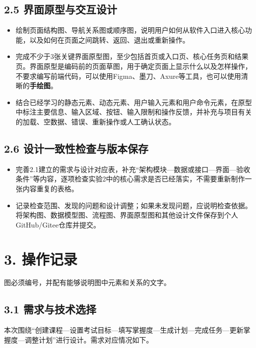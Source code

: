 \documentclass[UTF8,12pt,a4paper]{ctexart}
\begin{document}
\subsection*{2.5 界面原型与交互设计}

\begin{itemize}
  \item 绘制页面结构图、导航关系图或顺序图，说明用户如何从软件入口进入核心功能，以及如何在页面之间跳转、返回、退出或重新操作。
  \item 完成不少于3张关键界面原型图，至少包括首页或入口页、核心任务页和结果页。界面原型是编码前的页面草图，用于确定页面上显示什么以及怎样操作，不要求编写前端代码，可以使用Figma、墨刀、Axure等工具，也可以使用清晰的\textbf{手绘图}。
  \item 结合已经学习的静态元素、动态元素、用户输入元素和用户命令元素，在原型中标注主要信息、输入区域、按钮、输入限制和操作反馈，并补充与项目有关的加载、空数据、错误、重新操作或人工确认状态。
\end{itemize}

\subsection*{2.6 设计一致性检查与版本保存}

\begin{itemize}
  \item 完善2.1建立的需求与设计对应表，补充“架构模块—数据或接口—界面—验收条件”等内容，逐项检查实验2中的核心需求是否已经落实，不需要重新制作一张内容重复的表格。
  \item 记录检查范围、发现的问题和设计调整；如果未发现问题，应说明检查依据。将架构图、数据模型图、流程图、界面原型图和其他设计文件保存到个人GitHub/Gitee仓库并提交。
\end{itemize}

\section*{3. 操作记录}

图必须编号，并配有能够说明图中元素和关系的文字。

\subsection*{3.1 需求与技术选择}

本次围绕“创建课程—设置考试目标—填写掌握度—生成计划—完成任务—更新掌握度—调整计划”进行设计。需求对应情况如下。
\end{document}
